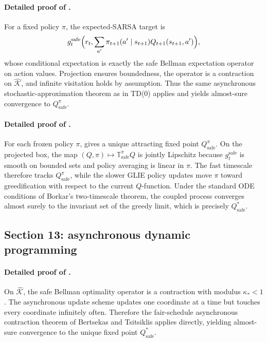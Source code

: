 \documentclass{article}
\theoremstyle{remark}
\newcommand{\safe}{\mathrm{safe}}
\newcommand{\Ksafe}{\widehat{\mathcal K}}
\begin{document}
\paragraph{Detailed proof of .}
For a fixed policy $\pi$, the expected-SARSA target is
\[
g_t^{\safe}\Bigl(r_t,\sum_{a'}\pi_{t+1}(a'\mid s_{t+1})Q_{t+1}(s_{t+1},a')\Bigr),
\]
whose conditional expectation is exactly the safe Bellman expectation operator on action values.
Projection ensures boundedness, the operator is a contraction on $\Ksafe$, and infinite visitation holds by assumption.
Thus the same asynchronous stochastic-approximation theorem as in TD(0) applies and yields almost-sure convergence to $Q_\safe^\pi$.

\paragraph{Detailed proof of .}
For each frozen policy $\pi$,  gives a unique attracting fixed point $Q_\safe^\pi$.
On the projected box, the map $(Q,\pi)\mapsto \mathbb T_\safe^\pi Q$ is jointly Lipschitz because $g_t^{\safe}$ is smooth on bounded sets and policy averaging is linear in $\pi$.
The fast timescale therefore tracks $Q_\safe^\pi$, while the slower GLIE policy updates move $\pi$ toward greedification with respect to the current $Q$-function.
Under the standard ODE conditions of Borkar's two-timescale theorem, the coupled process converges almost surely to the invariant set of the greedy limit, which is precisely $Q_\safe^*$.

\subsection{Section 13: asynchronous dynamic programming}
\label{app:async}

\paragraph{Detailed proof of .}
On $\Ksafe$, the safe Bellman optimality operator is a contraction with modulus $\kappa_*<1$.
The asynchronous update scheme updates one coordinate at a time but touches every coordinate infinitely often.
Therefore the fair-schedule asynchronous contraction theorem of Bertsekas and Tsitsiklis applies directly, yielding almost-sure convergence to the unique fixed point $Q_\safe^*$.





\end{document}
